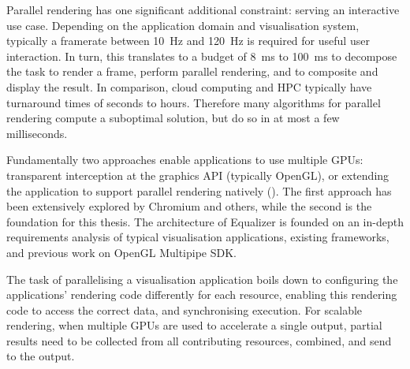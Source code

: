 Parallel rendering has one significant additional constraint: serving
an interactive use case. Depending on the application domain and visualisation
system, typically a framerate between 10~Hz and 120~Hz is required for
useful user interaction. In turn, this translates to a budget of 8~ms to
100~ms to decompose the task to render a frame, perform parallel rendering,
and to composite and display the result. In comparison, cloud computing and
HPC typically have turnaround times of seconds to hours. Therefore many
algorithms for parallel rendering compute a suboptimal solution,
but do so in at most a few milliseconds.

Fundamentally two approaches enable applications to use multiple
GPUs: transparent interception at the graphics API (typically OpenGL), or
extending the application to support parallel rendering natively
(). The first approach has been extensively explored by Chromium
and others, while the second is the foundation for this thesis. The
architecture of Equalizer is founded on an in-depth requirements analysis of
typical visualisation applications, existing frameworks, and previous work on
OpenGL Multipipe SDK.

The task of parallelising a visualisation application boils down to configuring
the applications' rendering code differently for each resource, enabling this
rendering code to access the correct data, and synchronising execution. For
scalable rendering, when multiple GPUs are used to accelerate a single output,
partial results need to be collected from all contributing resources, combined,
and send to the output.


